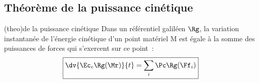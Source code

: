 \documentclass[../../main/main.tex]{subfiles}
\begin{document}
\vspace{-20pt}
\subsection{Théorème de la puissance cinétique}

\begin{tcb*}(theo){de la puissance cinétique}
	Dans un référentiel galiléen $\Rg$, la variation instantanée de l'énergie
	cinétique d'un point matériel M est égale à la somme des puissances de
	forces qui s'exercent sur ce point~:
	\[\boxed{\dv{\Ec_c\Rg(\Mr)}{t} = \sum_i \Pc\Rg(\Ff_i)}\]
\end{tcb*}

\end{document}
